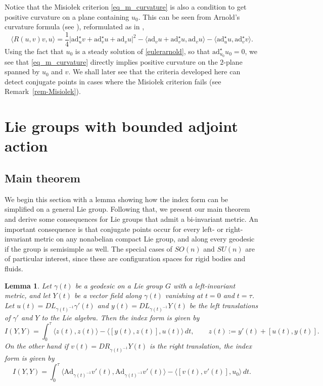 \documentclass[oneside, 11pt]{amsart}
\newtheorem{lemma}[theorem]{Lemma}
\numberwithin{equation}{section}
\newcommand{\ad}{\mathrm{ad}}
\newcommand{\Ad}{\mathrm{Ad}}
\newcommand{\adstar}{\ad^{\star}}
\begin{document}
Notice that the Misio{\l}ek criterion \eqref{eq_m_curvature} is also a condition to get positive curvature on a plane containing $u_0$. This can be seen from Arnold's curvature formula (see \cite{AK}), reformulated as in \cite{leepreston},
\begin{equation*} 
\big\langle R(u,v)v,u\big\rangle = \frac{1}{4} \lvert\adstar_uv+\adstar_vu+\ad_vu\rvert^2 
    - \langle\ad_vu + \adstar_vu, \ad_vu\rangle - \langle\adstar_uu, \adstar_vv\rangle.
\end{equation*}  
Using the fact that $u_0$ is a steady solution of \eqref{eulerarnold}, so that $\adstar_{u_0}u_0=0$, we see that \eqref{eq_m_curvature} directly implies positive curvature on the $2$-plane spanned by $u_0$ and $v$. We shall later see that the criteria developed here can detect conjugate points in cases where the Misio{\l}ek criterion fails (see Remark~\ref{rem-Misiolek}).

 
 

\section{Lie groups with bounded adjoint action}\label{sec:compact}

\subsection{Main theorem}

We begin this section with a lemma showing how the index form can be simplified on a general Lie group. Following that, we present our main theorem and derive some consequences for Lie groups that admit a bi-invariant metric. An important consequence is that conjugate points occur for every left- or right-invariant metric on any nonabelian compact Lie group, and along every geodesic if the group is semisimple as well. The special cases of  
$SO(n)$ and $SU(n)$ 
are of particular interest, since these are configuration spaces for rigid bodies and fluids.

\begin{lemma}\label{lemma_index}
Let $\gamma(t)$ be a geodesic on a Lie group $G$ with a left-invariant metric, and let $Y(t)$ be a vector field along $\gamma(t)$ vanishing at $t=0$ and $t=\tau$. Let $u(t)=DL_{\gamma(t)^{-1}}\gamma'(t)$ and $y(t)=DL_{\gamma(t)^{-1}}Y(t)$ be the left translations of $\gamma'$ and $Y$ to the Lie algebra. Then the index form is given by
    \begin{equation}\label{indexform}
    I(Y,Y) = \int_0^{\tau} \big\langle z(t),z(t)\rangle - \big\langle [y(t),z(t)], u(t)\big\rangle \, dt, \qquad z(t):=y'(t) + [u(t),y(t)].
    \end{equation}
On the other hand if $v(t) = DR_{\gamma(t)^{-1}}Y(t)$ is the right translation, the index form is given by    \begin{equation}\label{indexformconservation}
    I(Y,Y) = \int_0^{\tau} \big\langle \Ad_{\gamma(t)^{-1}}v'(t),\Ad_{\gamma(t)^{-1}}v'(t)\big\rangle - \big\langle [v(t),v'(t)], u_0\big\rangle \, dt.
    \end{equation}    
\end{lemma}
\end{document}
